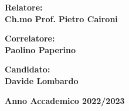 \begin{titlepage}
    \vspace{15mm}

    \par
    \noindent
    \begin{minipage}[t]{0.47\textwidth}
    {\large \textbf{Relatore:\\}}
    {\small \textbf{Ch.mo Prof.}} {\large \textbf{Pietro Caironi\\}}
    \vspace{10mm}
    
    {\large \textbf{Correlatore:\\}}
    {\large \textbf{Paolino Paperino\\}}
\end{minipage}
    \hfill
    \begin{minipage}[t]{0.47\textwidth}
        \raggedleft
        {\large \bf Candidato:\\
        Davide Lombardo\\}
    \end{minipage}
    
    \vspace{20mm}

    \begin{center}
        {\large \bf Anno Accademico 2022/2023}
    \end{center}
\end{titlepage}